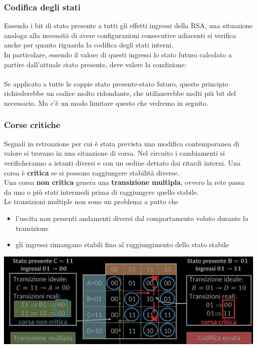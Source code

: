 \documentclass{article}
\begin{document}
\subsubsection{Codifica degli stati}
Essendo i bit di stato presente a tutti gli effetti ingressi della RSA, una situazione analoga alla necessità di avere configurazioni consecutive adiacenti si verifica anche per quanto riguarda la codifica degli stati interni.\\
In particolare, essendo il valore di questi ingressi lo stato futuro calcolato a partire dall’attuale stato presente, deve valere la condizione:
\vspace{0.2cm}\\
\noindent{}
\vspace{0.2cm}\\
Se applicato a tutte le coppie stato presente-stato futuro, questo principio richiederebbe un codice molto ridondante, che utilizzerebbe molti più bit del necessario. Ma c'è un modo limitare questo che vedremo in seguito.
\subsubsection*{Corse critiche}
Segnali in retroazione per cui è stata prevista una modifica contemporanea di valore si trovano in una situazione di corsa. Nel circuito i cambiamenti si verificheranno a istanti diversi e con un ordine dettato dai ritardi interni.
Una corsa è \textbf{\color{blue} critica} se si possono raggiungere stabilità diverse.\\
Una corsa \textbf{\color{blue} non critica} genera una \textbf{\color{blue} transizione multipla}, ovvero la rete passa da uno o più stati intermedi prima di raggiungere quello stabile.
\vspace{0.1cm}\\
Le transizioni multiple non sono un problema a patto che
\begin{itemize}
    \item l’uscita non presenti andamenti diversi dal comportamento voluto durante la transizione
    \item gli ingressi rimangano stabili fino al raggiungimento dello stato stabile
\end{itemize}
\begin{center}
    \includegraphics[scale=0.35]{CorseCritiche.png}
\end{center}
\end{document}
